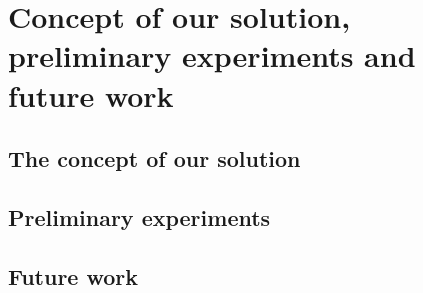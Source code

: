 \chapter{Concept of our solution, preliminary experiments and future work} %

\section{The concept of our solution}
\section{Preliminary experiments}
\section{Future work}
